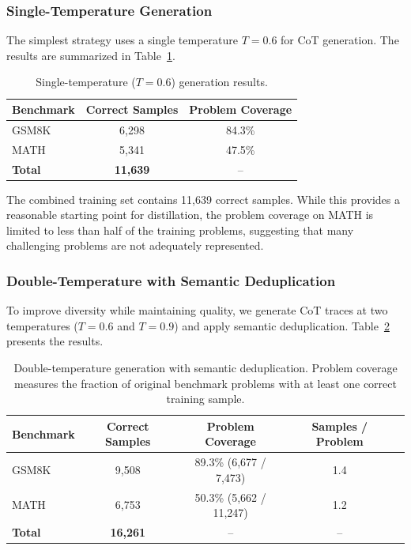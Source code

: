 \documentclass{article}
\begin{document}
\subsubsection{Single-Temperature Generation}

The simplest strategy uses a single temperature $T = 0.6$ for CoT generation. The results are summarized in Table~\ref{tab:single_temp}.

\begin{table}[H]
\centering
\caption{Single-temperature ($T = 0.6$) generation results.}
\label{tab:single_temp}
\begin{tabular}{lcc}
\toprule
\textbf{Benchmark} & \textbf{Correct Samples} & \textbf{Problem Coverage} \\
\midrule
GSM8K  & 6,298 & 84.3\% \\
MATH   & 5,341 & 47.5\% \\
\midrule
\textbf{Total} & \textbf{11,639} & -- \\
\bottomrule
\end{tabular}
\end{table}

The combined training set contains 11,639 correct samples. While this provides a reasonable starting point for distillation, the problem coverage on MATH is limited to less than half of the training problems, suggesting that many challenging problems are not adequately represented.

\subsubsection{Double-Temperature with Semantic Deduplication}

To improve diversity while maintaining quality, we generate CoT traces at two temperatures ($T = 0.6$ and $T = 0.9$) and apply semantic deduplication. Table~\ref{tab:double_temp} presents the results.

\begin{table}[H]
\centering
\caption{Double-temperature generation with semantic deduplication. Problem coverage measures the fraction of original benchmark problems with at least one correct training sample.}
\label{tab:double_temp}
\begin{tabular}{lcccc}
\toprule
\textbf{Benchmark} & \textbf{Correct Samples} & \textbf{Problem Coverage} & \textbf{Samples / Problem} \\
\midrule
GSM8K  & 9,508 & 89.3\% (6,677 / 7,473) & 1.4 \\
MATH   & 6,753 & 50.3\% (5,662 / 11,247) & 1.2 \\
\midrule
\textbf{Total} & \textbf{16,261} & -- & -- \\
\bottomrule
\end{tabular}
\end{table}
\end{document}
